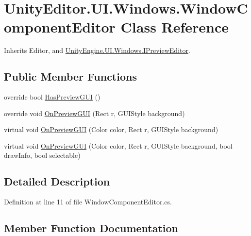 \hypertarget{class_unity_editor_1_1_u_i_1_1_windows_1_1_window_component_editor}{}\section{Unity\+Editor.\+U\+I.\+Windows.\+Window\+Component\+Editor Class Reference}
\label{class_unity_editor_1_1_u_i_1_1_windows_1_1_window_component_editor}


Inherits Editor, and \hyperlink{interface_unity_engine_1_1_u_i_1_1_windows_1_1_i_preview_editor}{Unity\+Engine.\+U\+I.\+Windows.\+I\+Preview\+Editor}.

\subsection*{Public Member Functions}
\begin{DoxyCompactItemize}
\item 
override bool \hyperlink{class_unity_editor_1_1_u_i_1_1_windows_1_1_window_component_editor_aed7fc5302656822ef3c13a2a7e98fb54}{Has\+Preview\+G\+U\+I} ()
\item 
override void \hyperlink{class_unity_editor_1_1_u_i_1_1_windows_1_1_window_component_editor_a5d26f9d3c5afd353d707c5e2ea21bb03}{On\+Preview\+G\+U\+I} (Rect r, G\+U\+I\+Style background)
\item 
virtual void \hyperlink{class_unity_editor_1_1_u_i_1_1_windows_1_1_window_component_editor_a86d26582c1f3a42eae58fa8903021b3a}{On\+Preview\+G\+U\+I} (Color color, Rect r, G\+U\+I\+Style background)
\item 
virtual void \hyperlink{class_unity_editor_1_1_u_i_1_1_windows_1_1_window_component_editor_a69705d10bcff6528802069b528508715}{On\+Preview\+G\+U\+I} (Color color, Rect r, G\+U\+I\+Style background, bool draw\+Info, bool selectable)
\end{DoxyCompactItemize}


\subsection{Detailed Description}


Definition at line 11 of file Window\+Component\+Editor.\+cs.



\subsection{Member Function Documentation}
\hypertarget{class_unity_editor_1_1_u_i_1_1_windows_1_1_window_component_editor_aed7fc5302656822ef3c13a2a7e98fb54}{}
